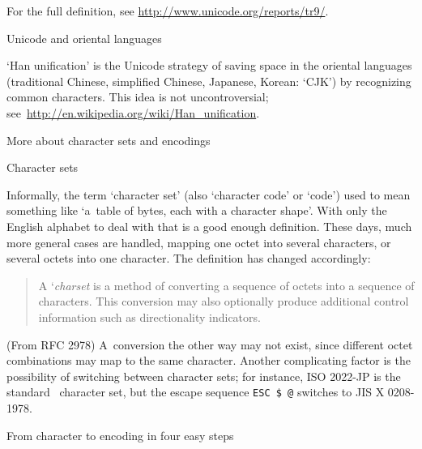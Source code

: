 For the full definition, see \url{http://www.unicode.org/reports/tr9/}.

 {Unicode and oriental languages}
\label{sec:unihan}

`Han unification' is the Unicode strategy of saving space in the
oriental languages (traditional Chinese, simplified Chinese, Japanese,
Korean: `CJK') by recognizing common characters. This idea is not
uncontroversial; see~\url{http://en.wikipedia.org/wiki/Han_unification}.

 {More about character sets and encodings}

 {Character sets}

Informally, the term `character set' (also `character code' or `code')
used to mean something like `a~table of
bytes, each with a character shape'. With only the English alphabet to
deal with that is a good enough definition. These days, much more general
cases are handled, mapping one octet into several characters, or
several octets into one character. The definition has changed
accordingly:
\begin{quote}
A `\emph{charset} is
a method of   converting a sequence of octets into a sequence of
characters.  This   conversion may also optionally produce additional
control information   such as directionality indicators.
\end{quote}
(From RFC 2978) A~conversion the other way may not exist, since
different octet combinations may map to the same character.  Another
complicating factor is the possibility of switching between character
sets; for instance, ISO 2022-JP is the standard
\ascii\ character set, but the escape sequence \verb+ESC $ @+ switches
to JIS X 0208-1978.

 {From character to encoding in four easy steps}

